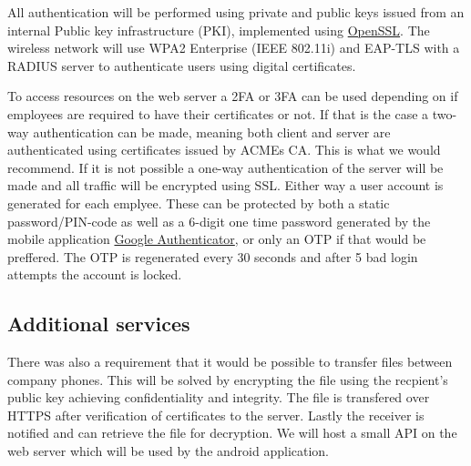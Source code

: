 All authentication will be performed using private and public keys issued from an internal Public key infrastructure (PKI), implemented using \href{https://pki.openca.org/}{OpenSSL}. The wireless network will use WPA2 Enterprise (IEEE 802.11i) and EAP-TLS with a RADIUS server to authenticate users using digital certificates.

To access resources on the web server a 2FA or 3FA can be used depending on if employees are required to have their certificates or not. If that is the case a two-way authentication can be made, meaning both client and server are authenticated using certificates issued by ACMEs CA. This is what we would recommend. If it is not possible a one-way authentication of the server will be made and all traffic will be encrypted using SSL. Either way a user account is generated for each emplyee. These can be protected by both a static password/PIN-code as well as a 6-digit one time password generated by the mobile application \href{http://en.wikipedia.org/wiki/Google_Authenticator}{Google Authenticator}, or only an OTP if that would be preffered. The OTP is regenerated every 30 seconds and after 5 bad login attempts the account is locked.

\subsection*{Additional services}

There was also a requirement that it would be possible to transfer files between company phones. This will be solved by encrypting the file using the recpient's public key achieving confidentiality and integrity. The file is transfered over HTTPS after verification of certificates to the server. Lastly the receiver is notified and can retrieve the file for decryption. We will host a small API on the web server which will be used by the android application.